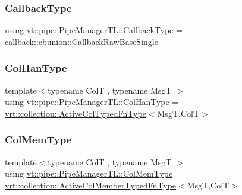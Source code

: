 \subsubsection{\texorpdfstring{Callback\+Type}{CallbackType}}
{\footnotesize\ttfamily using \hyperlink{structvt_1_1pipe_1_1_pipe_manager_t_l_a1cc1d0f1c80a36488f9b5d282e9755d2}{vt\+::pipe\+::\+Pipe\+Manager\+T\+L\+::\+Callback\+Type} =  \hyperlink{structvt_1_1pipe_1_1callback_1_1cbunion_1_1_callback_raw_base_single}{callback\+::cbunion\+::\+Callback\+Raw\+Base\+Single}}

\mbox{\label{structvt_1_1pipe_1_1_pipe_manager_t_l_a0bf4e2e805b3ce2be9f499e0e39aadfa}} 
\subsubsection{\texorpdfstring{Col\+Han\+Type}{ColHanType}}
{\footnotesize\ttfamily template$<$typename ColT , typename MsgT $>$ \\
using \hyperlink{structvt_1_1pipe_1_1_pipe_manager_t_l_a0bf4e2e805b3ce2be9f499e0e39aadfa}{vt\+::pipe\+::\+Pipe\+Manager\+T\+L\+::\+Col\+Han\+Type} =  \hyperlink{namespacevt_1_1vrt_1_1collection_a1f4b9c5fe895842f49952a29592bc206}{vrt\+::collection\+::\+Active\+Col\+Typed\+Fn\+Type}$<$MsgT,ColT$>$}

\mbox{\label{structvt_1_1pipe_1_1_pipe_manager_t_l_abf7ad21be4f3d0db51d643aa8ea959cc}} 
\subsubsection{\texorpdfstring{Col\+Mem\+Type}{ColMemType}}
{\footnotesize\ttfamily template$<$typename ColT , typename MsgT $>$ \\
using \hyperlink{structvt_1_1pipe_1_1_pipe_manager_t_l_abf7ad21be4f3d0db51d643aa8ea959cc}{vt\+::pipe\+::\+Pipe\+Manager\+T\+L\+::\+Col\+Mem\+Type} =  \hyperlink{namespacevt_1_1vrt_1_1collection_a87925616c03cf4ccc548d33b2fe172ee}{vrt\+::collection\+::\+Active\+Col\+Member\+Typed\+Fn\+Type}$<$MsgT,ColT$>$}

